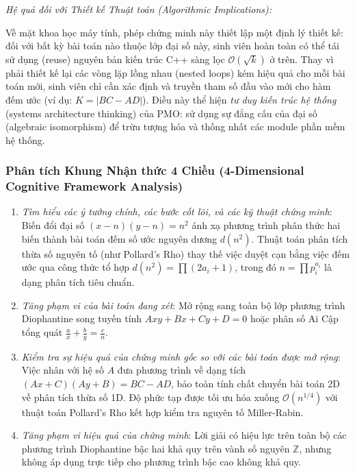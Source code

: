 \documentclass{article}
\begin{document}
\vspace{0.5em}\noindent\textit{Hệ quả đối với Thiết kế Thuật toán (Algorithmic Implications):}

Về mặt khoa học máy tính, phép chứng minh này thiết lập một định lý thiết kế: đối với bất kỳ bài toán nào thuộc lớp đại số này, sinh viên hoàn toàn có thể tái sử dụng (reuse) nguyên bản kiến trúc C++ sàng lọc $\mathcal{O}(\sqrt{k})$ ở trên. Thay vì phải thiết kế lại các vòng lặp lồng nhau (nested loops) kém hiệu quả cho mỗi bài toán mới, sinh viên chỉ cần xác định và truyền tham số đầu vào mới cho hàm đếm ước (ví dụ: $K = |BC - AD|$). Điều này thể hiện \textit{tư duy kiến trúc hệ thống} (systems architecture thinking) của PMO: sử dụng sự đẳng cấu của đại số (algebraic isomorphism) để trừu tượng hóa và thống nhất các module phần mềm hệ thống.





\subsubsection*{Phân tích Khung Nhận thức 4 Chiều (4-Dimensional Cognitive Framework Analysis)}
\begin{enumerate}
 \item \textit{Tìm hiểu các ý tưởng chính, các bước cốt lõi, và các kỹ thuật chứng minh}: Biến đổi đại số $(x-n)(y-n) = n^2$ ánh xạ phương trình phân thức hai biến thành bài toán đếm số ước nguyên dương $d(n^2)$. Thuật toán phân tích thừa số nguyên tố (như Pollard's Rho) thay thế việc duyệt cạn bằng việc đếm ước qua công thức tổ hợp $d(n^2) = \prod (2a_i + 1)$, trong đó $n = \prod p_i^{a_i}$ là dạng phân tích tiêu chuẩn.
 \item \textit{Tăng phạm vi của bài toán đang xét}: Mở rộng sang toàn bộ lớp phương trình Diophantine song tuyến tính $Axy + Bx + Cy + D = 0$ hoặc phân số Ai Cập tổng quát $\frac{a}{x} + \frac{b}{y} = \frac{c}{n}$.
 \item \textit{Kiểm tra sự hiệu quả của chứng minh gốc so với các bài toán được mở rộng}: Việc nhân với hệ số $A$ đưa phương trình về dạng tích $(Ax + C)(Ay + B) = BC - AD$, bảo toàn tính chất chuyển bài toán 2D về phân tích thừa số 1D. Độ phức tạp được tối ưu hóa xuống $\mathcal{O}(n^{1/4})$ với thuật toán Pollard's Rho kết hợp kiểm tra nguyên tố Miller-Rabin.
 \item \textit{Tăng phạm vi hiệu quả của chứng minh}: Lời giải có hiệu lực trên toàn bộ các phương trình Diophantine bậc hai khả quy trên vành số nguyên $\mathbb{Z}$, nhưng không áp dụng trực tiếp cho phương trình bậc cao không khả quy.
\end{enumerate}
\end{document}
